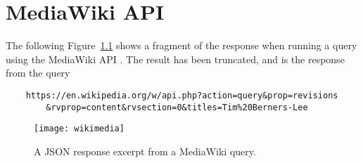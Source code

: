 \chapter{MediaWiki API}
\label{app:mediawiki}
The following Figure~\ref{fig:wiki} shows a fragment of the response when running a query using the MediaWiki API \cite{mediawiki}. The result has been truncated, and is the response from the query

\begin{lstlisting}
	https://en.wikipedia.org/w/api.php?action=query&prop=revisions
		&rvprop=content&rvsection=0&titles=Tim%20Berners-Lee
\end{lstlisting}

\begin{figure}[h]
	\texttt{[image: wikimedia]}
	\caption{A JSON response excerpt from a MediaWiki query.}
	\label{fig:wiki}
\end{figure}